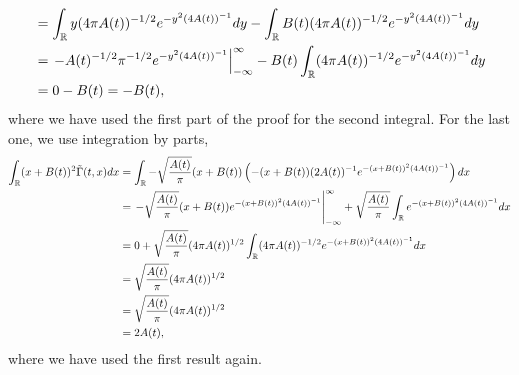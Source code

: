 \begin{questions}
\begin{solution}
\begin{align*}
&=\int_{\mathbb{R}}y(4\pi A(t))^{-1/2}e^{-y^2(4A(t))^{-1}}dy-\int_{\mathbb{R}}B(t)(4\pi A(t))^{-1/2}e^{-y^2(4A(t))^{-1}}dy\\
&=\left.-A(t)^{-1/2}\pi^{-1/2}e^{-y^2(4A(t))^{-1}}\right|_{-\infty}^{\infty}-B(t)\int_{\mathbb{R}}(4\pi A(t))^{-1/2}e^{-y^2(4A(t))^{-1}}dy\\
&=0-B(t)=-B(t),
\end{align*}
where we have used the first part of the proof for the second integral. For the last one, we use integration by parts,
\begin{align*}
\int_{\mathbb{R}}(x+B(t))^2\tilde{\Gamma}(t,x)dx&=\int_{\mathbb{R}}-\sqrt{\frac{A(t)}{\pi}}(x+B(t))\left(-(x+B(t))(2A(t))^{-1}e^{-(x+B(t))^2(4A(t))^{-1}}\right)dx\\
&=\left.-\sqrt{\frac{A(t)}{\pi}}(x+B(t))e^{-(x+B(t))^2(4A(t))^{-1}}\right|_{-\infty}^{\infty}+\sqrt{\frac{A(t)}{\pi}}\int_{\mathbb{R}}e^{-(x+B(t))^2(4A(t))^{-1}}dx\\
&=0+\sqrt{\frac{A(t)}{\pi}}(4\pi A(t))^{1/2}\int_{\mathbb{R}}(4\pi A(t))^{-1/2}e^{-(x+B(t))^2(4A(t))^{-1}}dx\\
&=\sqrt{\frac{A(t)}{\pi}}(4\pi A(t))^{1/2}\\
&=\sqrt{\frac{A(t)}{\pi}}(4\pi A(t))^{1/2}\\
&=2A(t),
\end{align*}
where we have used the first result again.
\end{solution}	

\end{questions}